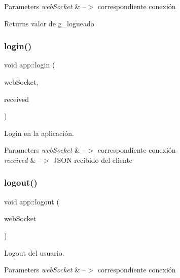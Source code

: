 \begin{DoxyParams}{Parameters}
{\em web\+Socket} & --$>$ correspondiente conexión \\
\hline
\end{DoxyParams}
\begin{DoxyReturn}{Returns}
valor de g\+\_\+logueado 
\end{DoxyReturn}
\mbox{\label{classapp_a0bb96ab42618921392ac30e13444391c}} 
\subsubsection{\texorpdfstring{login()}{login()}}
{\footnotesize\ttfamily void app\+::login (\begin{DoxyParamCaption}\item[{ix\+::\+Web\+Socket $\ast$}]{web\+Socket,  }\item[{\mbox{\hyperlink{classnlohmann_1_1basic__json}{J\+S\+ON}}}]{received }\end{DoxyParamCaption})}



Login en la aplicación. 


\begin{DoxyParams}{Parameters}
{\em web\+Socket} & --$>$ correspondiente conexión \\
\hline
{\em received} & --$>$ J\+S\+ON recibido del cliente \\
\hline
\end{DoxyParams}
\mbox{\label{classapp_a93176ba428640e16ea767d95319ce0c2}} 
\subsubsection{\texorpdfstring{logout()}{logout()}}
{\footnotesize\ttfamily void app\+::logout (\begin{DoxyParamCaption}\item[{ix\+::\+Web\+Socket $\ast$}]{web\+Socket }\end{DoxyParamCaption})}



Logout del usuario. 


\begin{DoxyParams}{Parameters}
{\em web\+Socket} & --$>$ correspondiente conexión \\
\hline
\end{DoxyParams}
\mbox{\label{classapp_a6f44f304590371aa8aae2a2e7b504a64}} 
